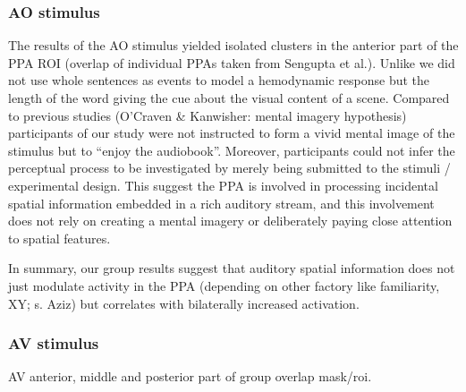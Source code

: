 \documentclass[english]{article}
\begin{document}
\subsubsection{AO stimulus}
The results of the AO stimulus yielded isolated clusters in the anterior part of
the PPA ROI (overlap of individual PPAs taken from Sengupta et al.).
Unlike \citep{aziz2008modulation} we did not use whole sentences as events to
model a hemodynamic response but the length of the word giving the cue about the
visual content of a scene.
Compared to previous studies (O'Craven \& Kanwisher: mental imagery
hypothesis) participants of our study were not
instructed to form a vivid mental image of the stimulus but to ``enjoy the
audiobook''.
Moreover, participants could not infer the perceptual process to be investigated
by merely being submitted to the stimuli / experimental design.
This suggest the PPA is involved in processing incidental spatial information
embedded in a rich auditory stream, and this involvement does not rely on
creating a mental imagery or deliberately paying close attention to spatial
features.

In summary, our group results suggest that auditory spatial information does not
just modulate activity in the PPA (depending on other factory like familiarity,
XY; s. Aziz) but correlates with bilaterally increased
activation.


\subsubsection{AV stimulus}

AV anterior, middle and posterior part of group overlap mask/roi.
\end{document}
